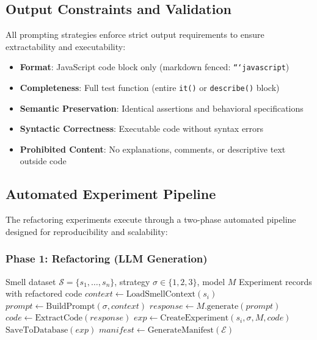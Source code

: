 \documentclass[12pt]{article}
\begin{document}
\subsection{Output Constraints and Validation}

All prompting strategies enforce strict output requirements to ensure extractability and executability:

\begin{itemize}
    \item \textbf{Format}: JavaScript code block only (markdown fenced: \texttt{```javascript})
    \item \textbf{Completeness}: Full test function (entire \texttt{it()} or \texttt{describe()} block)
    \item \textbf{Semantic Preservation}: Identical assertions and behavioral specifications
    \item \textbf{Syntactic Correctness}: Executable code without syntax errors
    \item \textbf{Prohibited Content}: No explanations, comments, or descriptive text outside code
\end{itemize}

\subsection{Automated Experiment Pipeline}
\label{sec:pipeline}

The refactoring experiments execute through a two-phase automated pipeline designed for reproducibility and scalability:

\subsubsection{Phase 1: Refactoring (LLM Generation)}

\begin{algorithm}
\caption{Batch Refactoring Phase}
\label{alg:refactor-phase}
\begin{algorithmic}[1]
\Require Smell dataset $\mathcal{S} = \{s_1, \ldots, s_n\}$, strategy $\sigma \in \{1, 2, 3\}$, model $M$
\Ensure Experiment records with refactored code
    \State $context \gets \text{LoadSmellContext}(s_i)$ 
    \State $prompt \gets \text{BuildPrompt}(\sigma, context)$ 
    \State $response \gets M.\text{generate}(prompt)$ 
    \State $code \gets \text{ExtractCode}(response)$ 
    \State $exp \gets \text{CreateExperiment}(s_i, \sigma, M, code)$
    \State $\text{SaveToDatabase}(exp)$ 
\EndFor
\State $manifest \gets \text{GenerateManifest}(\mathcal{E})$ 
\end{algorithmic}
\end{algorithm}
\end{document}
